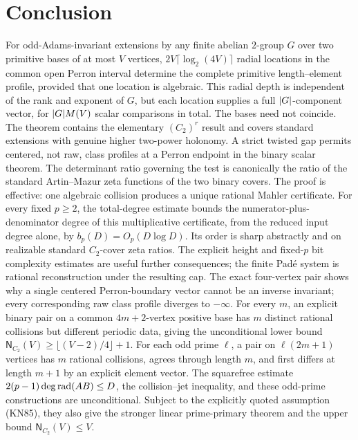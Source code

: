 \section{Conclusion}
\label{sec:conclusion}

For odd-Adams-invariant extensions by any finite abelian \(2\)-group \(G\)
over two primitive bases of at most \(V\) vertices,
\(2V\lceil\log_2(4V)\rceil\) radial locations in the common open Perron
interval determine the complete primitive length--element profile, provided
that one location is algebraic.  This radial depth is independent of the rank
and exponent of \(G\), but each location supplies a full
\(\lvert G \rvert\)-component vector, for \(\lvert G \rvert M(V)\) scalar comparisons in total.
The bases need not coincide.  The theorem contains the elementary
\((C_2)^r\) result and covers standard extensions with genuine higher
two-power holonomy.  A
strict twisted gap permits centered, not raw, class profiles at a Perron
endpoint in the binary scalar theorem.  The determinant ratio governing the
test is canonically the ratio of the standard Artin--Mazur zeta functions of
the two binary covers.  The proof is effective: one algebraic collision
produces a unique rational Mahler certificate.  For every fixed \(p\ge2\),
the total-degree estimate bounds the numerator-plus-denominator degree
of this multiplicative certificate, from the reduced input degree alone, by
\(b_p(D)=O_p(D\log D)\).  Its order is sharp abstractly and on realizable
standard \(C_2\)-cover zeta ratios.  The explicit height and fixed-\(p\) bit
complexity estimates are useful further consequences; the finite Pad\'e
system is rational reconstruction under the resulting cap.  The exact four-vertex
pair shows why a single centered Perron-boundary vector cannot be an inverse
invariant; every corresponding raw class profile diverges to \(-\infty\).
For every \(m\), an explicit binary pair on a common \(4m+2\)-vertex positive
base has \(m\) distinct rational collisions but different periodic data,
giving the unconditional lower bound
\(\mathsf N_{C_2}(V)\ge\lfloor(V-2)/4\rfloor+1\).
For each odd prime \(\ell\), a pair on \(\ell(2m+1)\) vertices has \(m\)
rational collisions, agrees through length \(m\), and first differs at length
\(m+1\) by an explicit element vector.
The squarefree estimate
\(2(p-1)\deg\operatorname{rad}(AB)\le D\), the collision--jet inequality, and these
odd-prime constructions are unconditional.  Subject to the explicitly
quoted assumption \textup{(KN85)}, they also give the stronger linear
prime-primary theorem and the upper bound \(\mathsf N_{C_2}(V)\le V\).

